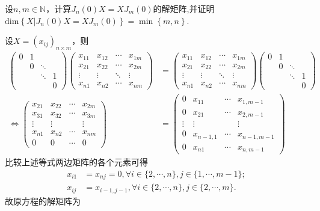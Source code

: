 \documentclass[../../main.tex]{subfiles}%
\begin{document}
\begin{proposition}\label{proposition:与J_n(0)可交换的的矩阵}
设$n,m\in\mathbb{N}$，计算$J_n(0)X = XJ_m(0)$的解矩阵,并证明$\mathrm{dim}\left\{ X|J_n\left( 0 \right) X=XJ_m\left( 0 \right) \right\} =\min \left\{ m,n \right\}$.
\end{proposition}
\begin{solution}
设$X=(x_{ij})_{n\times m}$，则
\begin{align*}
\begin{pmatrix}
0 & 1 &  &  \\
 & 0 & \ddots &  \\
 &  & \ddots & 1 \\
 &  &  & 0
\end{pmatrix}
\begin{pmatrix}
x_{11} & x_{12} & \cdots & x_{1m} \\
x_{21} & x_{22} & \cdots & x_{2m} \\
\vdots & \vdots & \ddots & \vdots \\
x_{n1} & x_{n2} & \cdots & x_{nm}
\end{pmatrix}
&=
\begin{pmatrix}
x_{11} & x_{12} & \cdots & x_{1m} \\
x_{21} & x_{22} & \cdots & x_{2m} \\
\vdots & \vdots & \ddots & \vdots \\
x_{n1} & x_{n2} & \cdots & x_{nm}
\end{pmatrix}
\begin{pmatrix}
0 & 1 &  &  \\
 & 0 & \ddots &  \\
 &  & \ddots & 1 \\
 &  &  & 0
\end{pmatrix} \\
\Longleftrightarrow
\begin{pmatrix}
x_{21} & x_{22} & \cdots & x_{2m} \\
x_{31} & x_{32} & \cdots & x_{3m} \\
\vdots & \vdots &  & \vdots \\
x_{n1} & x_{n2} & \cdots & x_{nm} \\
0 & 0 & \cdots & 0
\end{pmatrix}
&=
\begin{pmatrix}
0 & x_{11} & \cdots & x_{1,m - 1} \\
0 & x_{21} & \cdots & x_{2,m - 1} \\
\vdots & \vdots &  & \vdots \\
0 & x_{n - 1,1} & \cdots & x_{n - 1,m - 1} \\
0 & x_{n1} & \cdots & x_{n,m - 1}
\end{pmatrix}
\end{align*}
比较上述等式两边矩阵的各个元素可得
\begin{align*}
x_{i1}&=x_{nj}=0, \forall i\in\{2,\cdots,n\}, j\in\{1,\cdots,m - 1\}; \\
x_{ij}&=x_{i - 1,j - 1}, \forall i\in\{2,\cdots,n\}, j\in\{2,\cdots,m\}.
\end{align*}
故原方程的解矩阵为


\end{solution}
\end{document}
